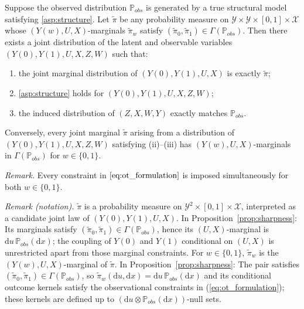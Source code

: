 \begin{proposition} \label{prop:sharpness}
    Suppose the observed distribution $\mathbb{P}_{obs}$ is generated by a true structural model satisfying \cref{asp:structure}. Let $\tilde{\pi}$ be any probability measure on $\mathcal{Y} \times \mathcal{Y} \times [0,1] \times \mathcal{X}$ whose $(Y(w), U, X)$-marginals $\tilde{\pi}_w$ satisfy $(\tilde{\pi}_0, \tilde{\pi}_1) \in \Gamma(\mathbb{P}_{obs})$. Then there exists a joint distribution of the latent and observable variables $(Y(0), Y(1), U, X, Z, W)$ such that:
    \begin{enumerate}
        \item[(i)] the joint marginal distribution of $(Y(0), Y(1), U, X)$ is exactly $\tilde{\pi}$;
        \item[(ii)] \cref{asp:structure} holds for $(Y(0), Y(1), U, X, Z, W)$;
        \item[(iii)] the induced distribution of $(Z, X, W, Y)$ exactly matches $\mathbb{P}_{obs}$.
    \end{enumerate}
    Conversely, every joint marginal $\tilde{\pi}$ arising from a distribution of $(Y(0), Y(1), U, X, Z, W)$ satisfying \textup{(ii)}--\textup{(iii)} has $(Y(w), U, X)$-marginals in $\Gamma(\mathbb{P}_{obs})$ for $w \in \{0, 1\}$.
\end{proposition}

\noindent\textit{Remark.} Every constraint in $\eqref{eq:ot_formulation}$ is imposed simultaneously for both $w\in\{0,1\}$.

\noindent\textit{Remark (notation).} $\tilde{\pi}$ is a probability measure on $\mathcal Y^2\times[0,1]\times\mathcal X$, interpreted as a candidate joint law of $(Y(0),Y(1),U,X)$. In Proposition~\ref{prop:sharpness}: Its marginals satisfy $(\tilde{\pi}_0,\tilde{\pi}_1)\in\Gamma(\mathbb P_{obs})$, hence its $(U,X)$-marginal is $\mathrm du\,\mathbb P_{obs}(\mathrm dx)$; the coupling of $Y(0)$ and $Y(1)$ conditional on $(U,X)$ is unrestricted apart from those marginal constraints. For $w\in\{0,1\}$, $\tilde{\pi}_w$ is the $(Y(w),U,X)$-marginal of $\tilde{\pi}$. In Proposition~\ref{prop:sharpness}: The pair satisfies $(\tilde{\pi}_0,\tilde{\pi}_1)\in\Gamma(\mathbb P_{obs})$, so $\tilde{\pi}_w(\mathrm du,\mathrm dx)=\mathrm du\,\mathbb P_{obs}(\mathrm dx)$ and its conditional outcome kernels satisfy the observational constraints in (\ref{eq:ot_formulation}); these kernels are defined up to $(\mathrm du\otimes\mathbb P_{obs}(\mathrm dx))$-null sets.


